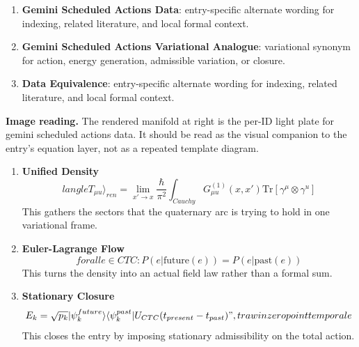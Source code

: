 \begin{enumerate}[leftmargin=1.6em,itemsep=6pt,topsep=4pt]
\item \textbf{Gemini Scheduled Actions Data}: entry-specific alternate wording for indexing, related literature, and local formal context.
\item \textbf{Gemini Scheduled Actions Variational Analogue}: variational synonym for action, energy generation, admissible variation, or closure.
\item \textbf{Data Equivalence}: entry-specific alternate wording for indexing, related literature, and local formal context.
\end{enumerate}

\begin{samepage}
\noindent\begin{minipage}[t]{0.45\linewidth}
\vspace{0pt}
\raggedright
\scriptsize\textbf{Image reading.} The rendered manifold at right is the per-ID light plate for gemini scheduled actions data. It should be read as the visual companion to the entry's equation layer, not as a repeated template diagram.\par
\end{minipage}\hfill
\begin{minipage}[t]{0.53\linewidth}
\vspace*{-0.10in}
\raggedright
{}
\end{minipage}
\end{samepage}

\clearpage


\begin{enumerate}[leftmargin=1.6em,itemsep=9pt,topsep=6pt]
\item \textbf{Unified Density}
\[
langle T_{\mu u} \rangle_{ren} = \lim_{x' \to x} \frac{\hbar}{\pi^2} \int_{Cauchy} G_{\mu u}^{(1)}(x, x') \text{Tr}[\gamma^\mu \otimes \gamma^ u]
\]
This gathers the sectors that the quaternary arc is trying to hold in one variational frame.

\item \textbf{Euler-Lagrange Flow}
\[
forall e \in CTC : P(e | \text{future}(e)) = P(e | \text{past}(e))
\]
This turns the density into an actual field law rather than a formal sum.

\item \textbf{Stationary Closure}
\[
E_k = \sqrt{p_k} |\psi_k^{future}\rangle \langle \psi_k^{past}| U_{CTC}(t_{present} - t_{past})",trawin zero point temporal e
\]
This closes the entry by imposing stationary admissibility on the total action.
\end{enumerate}

